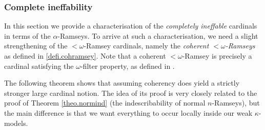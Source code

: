 \documentclass[../../main]{subfiles}
\begin{document}
\subsubsection{Complete ineffability}

In this section we provide a characterisation of the \textit{completely ineffable} cardinals in terms of the $\alpha$-Ramseys. To arrive at such a characterisation, we need a slight strengthening of the ${<}\omega$-Ramsey cardinals, namely the \textit{coherent ${<}\omega$-Ramseys} as defined in \ref{defi.cohramsey}. Note that a coherent ${<}\omega$-Ramsey is precisely a cardinal satisfying the $\omega$-filter property, as defined in \cite{HolySchlicht}.

\qquad The following theorem shows that assuming coherency does yield a strictly stronger large cardinal notion. The idea of its proof is very closely related to the proof of Theorem \ref{theo.normind} (the indescribability of normal $n$-Ramseys), but the main difference is that we want everything to occur locally inside our weak $\kappa$-models.
\end{document}
